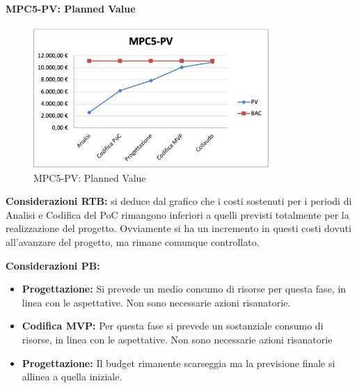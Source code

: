 \paragraph{MPC5-PV: Planned Value}
\begin{figure}[h!]
    \centering
    \includegraphics[width=0.8\textwidth]{images/MPC5-PV.png}
    \caption{MPC5-PV: Planned Value}
\end{figure}
\noindent \textbf{Considerazioni RTB:} si deduce dal grafico che i costi sostenuti per i periodi di Analisi e Codifica del PoC rimangono inferiori a quelli previsti totalmente per la realizzazione del progetto. Ovviamente si ha un incremento in questi costi dovuti all'avanzare del progetto, ma rimane comunque controllato.

\newpage

\noindent \textbf{Considerazioni PB:} 
\begin{itemize}
    \item \textbf{Progettazione:} Si prevede un medio consumo di risorse per questa fase, in linea con le aspettative. Non sono necessarie azioni risanatorie.
    \item \textbf{Codifica MVP:} Per questa fase si prevede un sostanziale consumo di risorse, in linea con le aspettative. Non sono necessarie azioni risanatorie
    \item \textbf{Progettazione:} Il budget rimanente scarseggia ma la previsione finale si allinea a quella iniziale. 
\end{itemize}

